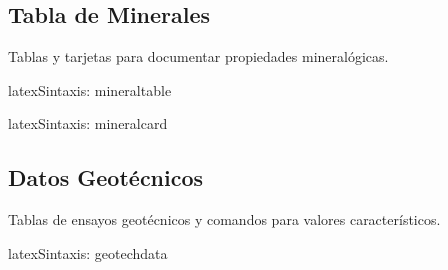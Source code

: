 \subsection{Tabla de Minerales}
\label{subsec:minerales}

Tablas y tarjetas para documentar propiedades mineralógicas.


\begin{codigosimple}{latex}{Sintaxis: mineraltable}
\begin{mineraltable}
\end{mineraltable}
\end{codigosimple}

\begin{mineraltable}
\end{mineraltable}


\begin{codigosimple}{latex}{Sintaxis: mineralcard}
\end{codigosimple}

\vspace{1em}
\noindent
{}
\hfill
{}

\subsection{Datos Geotécnicos}
\label{subsec:geotecnia}

Tablas de ensayos geotécnicos y comandos para valores característicos.


\begin{codigosimple}{latex}{Sintaxis: geotechdata}
\begin{geotechdata}
\end{geotechdata}
\end{codigosimple}

